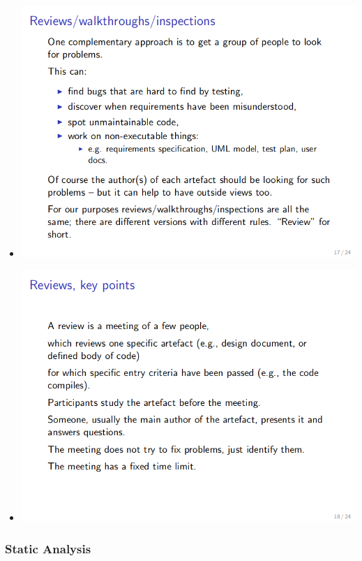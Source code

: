 \documentclass[a4paper]{article}
\providecommand{\tightlist}{%
  \setlength{\itemsep}{0pt}\setlength{\parskip}{0pt}}
\begin{document}
\begin{itemize}
\tightlist
\item
  \includegraphics{2C-SE.assets/1542636369213.png}
\item
  \includegraphics{2C-SE.assets/1542636375661.png}
\end{itemize}

\hypertarget{static-analysis}{%
\subsubsection{Static Analysis}\label{static-analysis}}
\end{document}
